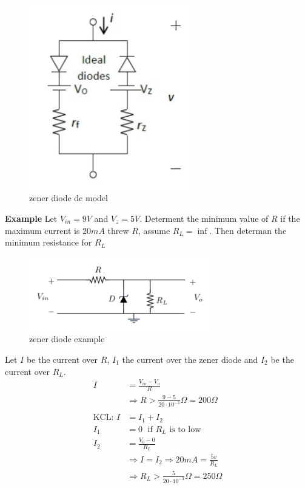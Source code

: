 \documentclass{article}
\begin{document}
\begin{figure}[h]
    \centering
    \includegraphics[width=7cm]{image/zener_diode_dc.png}
    \caption{zener diode dc model}
\end{figure}

\newpage
\textbf{Example}
Let $V_{in}=9V$ and $V_z=5V$. Determent the minimum value of $R$ if 
the maximum current is $20mA$ threw $R$, assume $R_L=\inf$. 
Then determan the minimum resistance for $R_L$
\begin{figure}[h]
    \vspace{10mm}
    \centering
    \includegraphics[width=8cm]{image/example_zener-diode.pdf}
    \caption{zener diode example}
\end{figure}

Let $I$ be the current over $R$, $I_1$ the current over the zener diode
and $I_2$ be the current over $R_L$.
\begin{align*}
    I &= \frac{V_{in}-V_o}{R} \\
    &\Rightarrow R > \frac{9-5}{20\cdot10^{-3}}\Omega = 200\Omega \\ 
    \\
    \text{KCL: }  I &= I_1 + I_2 \\
    I_1 &= 0 \; \text{ if $R_L$ is to low} \\
    I_2 &= \frac{V_0-0}{R_L} \\
    &\Rightarrow I = I_2 \Rightarrow 20mA = \frac{5v}{R_L} \\
    &\Rightarrow R_L > \frac{5}{20\cdot10^{-3}}\Omega = 250\Omega \\
\end{align*}
\end{document}
